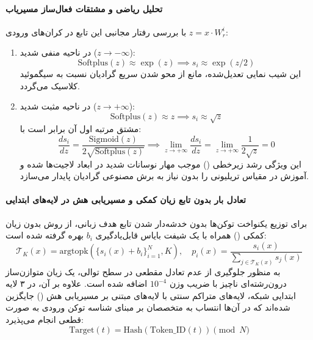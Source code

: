 \paragraph*{تحلیل ریاضی و مشتقات فعال‌ساز مسیریاب}
با بررسی رفتار مجانبی این تابع در کران‌های ورودی $z = x \cdot W_r^i$:
\begin{enumerate}
    \item در ناحیه منفی شدید ($z \to -\infty$):
    \begin{equation}
        \text{Softplus}(z) \approx \exp(z) \implies s_i \approx \exp(z/2)
    \end{equation}
    این شیب نمایی تعدیل‌شده، مانع از محو شدن سریع گرادیان نسبت به سیگموئید کلاسیک می‌گردد.
    \item در ناحیه مثبت شدید ($z \to +\infty$):
    \begin{equation}
        \text{Softplus}(z) \approx z \implies s_i \approx \sqrt{z}
    \end{equation}
    مشتق مرتبه اول آن برابر است با:
    \begin{equation}
        \frac{d s_i}{dz} = \frac{\text{Sigmoid}(z)}{2\sqrt{\text{Softplus}(z)}} \implies \lim_{z \to +\infty} \frac{d s_i}{dz} = \lim_{z \to +\infty} \frac{1}{2\sqrt{z}} = 0
    \end{equation}
    این ویژگی رشد زیرخطی () موجب مهار نوسانات شدید در ابعاد لاجیت‌ها شده و آموزش در مقیاس تریلیونی را بدون نیاز به برش مصنوعی گرادیان پایدار می‌سازد.
\end{enumerate}

\paragraph*{تعادل بار بدون تابع زیان کمکی و مسیریابی هش در لایه‌های ابتدایی}
برای توزیع یکنواخت توکن‌ها بدون خدشه‌دار شدن تابع هدف زبانی، از روش بدون زیان کمکی () همراه با یک شیفت بایاس قابل‌یادگیری $b_i$ بهره گرفته شده است:
\begin{equation}
    \mathcal{T}_K(x) = \text{argtopk}\left(\{ s_i(x) + b_i \}_{i=1}^N, K\right), \quad p_i(x) = \frac{s_i(x)}{\sum_{j \in \mathcal{T}_K(x)} s_j(x)}
\end{equation}
به منظور جلوگیری از عدم تعادل مقطعی در سطح توالی، یک زیان متوازن‌ساز درون‌رشته‌ای ناچیز با ضریب وزن $10^{-4}$ اضافه شده است. علاوه بر آن، در ۳ لایه ابتدایی شبکه، لایه‌های متراکم سنتی با لایه‌های  مبتنی بر مسیریابی هش () \cite{roller2021hash} جایگزین شده‌اند که در آن‌ها انتساب به متخصصان بر مبنای شناسه توکن ورودی به صورت قطعی انجام می‌پذیرد:
\begin{equation}
    \text{Target}(t) = \text{Hash}(\text{Token\_ID}(t)) \pmod N
\end{equation}

